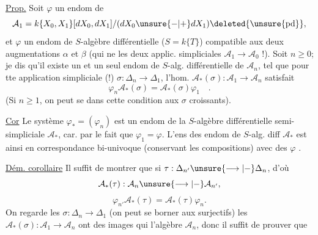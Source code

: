 \uline{Prop.} Soit $\varphi$ un endom de
\[
\mathcal A_1=k\{X_0,X_1\}[dX_0,dX_1]/(dX_0\unsure{-|+}dX_1)\deleted{\unsure{\mathrm{pd}}},
\]
et $\varphi$ \deleted{\unsure{\varphi}} un endom de $S$-algèbre différentielle ($S=k\{T\}$) compatible aux deux augmentations $\alpha$ et $\beta$ (qui ne  les deux applic. simpliciales $\mathcal A_1\longrightarrow\mathcal A_0$ !). Soit $n\ge0$; je dis qu'il existe un et un seul endom de $S$-alg. différentielle de $\mathcal A_n$,  tel que pour tte application simpliciale (!) $\sigma:\Delta_n\longrightarrow\Delta_1$, l'hom. $\mathcal A_*(\sigma):\mathcal A_1\to\mathcal A_n$ satisfait
\[
\varphi_n\mathcal A_*(\sigma)=\mathcal A_*(\sigma)\varphi_1\quad.
\]
 (Si $n\ge1$, on peut se   dans cette condition aux $\sigma$ croissants).


\uline{Cor}  Le système $\varphi_*=(\varphi_n)$ est un endom de la $S$-algèbre différentielle semi-simpliciale $\mathcal A_*$, car. \uline{} par le fait que $\varphi_1=\varphi$. L'ens des endom de $S$-alg. diff $\mathcal A_*$ est ainsi en correspondance bi-univoque (conservant les compositions) avec  des $\varphi$ .

\uline{Dém.  corollaire} Il suffit de montrer que si $\tau:\Delta_{n'}\unsure{\longrightarrow|-}\Delta_n$, d'où
\[
\mathcal A_*(\tau):\mathcal A_n\unsure{\longrightarrow|-}\mathcal A_{n'},
\]
\[
\varphi_{n'}\mathcal A_*(\tau)=\mathcal A_*(\tau)\varphi_n.
\]
On regarde les $\sigma:\Delta_n\longrightarrow\Delta_1$  (on peut se  borner aux surjectifs) les $\mathcal A_*(\sigma):\mathcal A_1\to\mathcal A_n$ ont des images qui  l'algèbre $\mathcal A_n$, donc il suffit de prouver que
